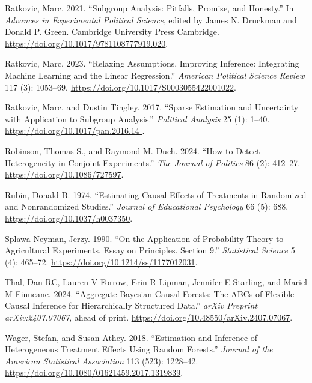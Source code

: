 \documentclass[
  10pt,
  a4paper,
  DIV=11,
  numbers=noendperiod]{scrartcl}
\newlength{\cslhangindent}
\newenvironment{CSLReferences}[2] %
 {\begin{list}{}{%
  \setlength{\itemindent}{0pt}
  \setlength{\leftmargin}{0pt}
  \setlength{\parsep}{0pt}
  \ifodd #1
   \setlength{\leftmargin}{\cslhangindent}
   \setlength{\itemindent}{-1\cslhangindent}
  \fi
  \setlength{\itemsep}{#2\baselineskip}}}
 {\end{list}}
\begin{document}
\begin{CSLReferences}{1}{1}
Ratkovic, Marc. 2021. {``Subgroup Analysis: Pitfalls, Promise, and
Honesty.''} In \emph{Advances in Experimental Political Science}, edited
by James N. Druckman and Donald P. Green. Cambridge University Press
Cambridge. \url{https://doi.org/10.1017/9781108777919.020}.

Ratkovic, Marc. 2023. {``Relaxing Assumptions, Improving Inference:
Integrating Machine Learning and the Linear Regression.''}
\emph{American Political Science Review} 117 (3): 1053--69.
\url{https://doi.org/10.1017/S0003055422001022}.

Ratkovic, Marc, and Dustin Tingley. 2017. {``Sparse Estimation and
Uncertainty with Application to Subgroup Analysis.''} \emph{Political
Analysis} 25 (1): 1--40.
\href{https://doi.org/10.1017/pan.2016.14\%20}{https://doi.org/10.1017/pan.2016.14
}.

Robinson, Thomas S., and Raymond M. Duch. 2024. {``How to Detect
Heterogeneity in Conjoint Experiments.''} \emph{The Journal of Politics}
86 (2): 412--27. \url{https://doi.org/10.1086/727597}.

Rubin, Donald B. 1974. {``Estimating Causal Effects of Treatments in
Randomized and Nonrandomized Studies.''} \emph{Journal of Educational
Psychology} 66 (5): 688. \url{https://doi.org/10.1037/h0037350}.

Splawa-Neyman, Jerzy. 1990. {``On the Application of Probability Theory
to Agricultural Experiments. Essay on Principles. Section 9.''}
\emph{Statistical Science} 5 (4): 465--72.
\url{https://doi.org/10.1214/ss/1177012031}.

Thal, Dan RC, Lauren V Forrow, Erin R Lipman, Jennifer E Starling, and
Mariel M Finucane. 2024. {``Aggregate Bayesian Causal Forests: The ABCs
of Flexible Causal Inference for Hierarchically Structured Data.''}
\emph{arXiv Preprint arXiv:2407.07067}, ahead of print.
\url{https://doi.org/10.48550/arXiv.2407.07067}.

Wager, Stefan, and Susan Athey. 2018. {``Estimation and Inference of
Heterogeneous Treatment Effects Using Random Forests.''} \emph{Journal
of the American Statistical Association} 113 (523): 1228--42.
\url{https://doi.org/10.1080/01621459.2017.1319839}.


\end{CSLReferences}
\end{document}
